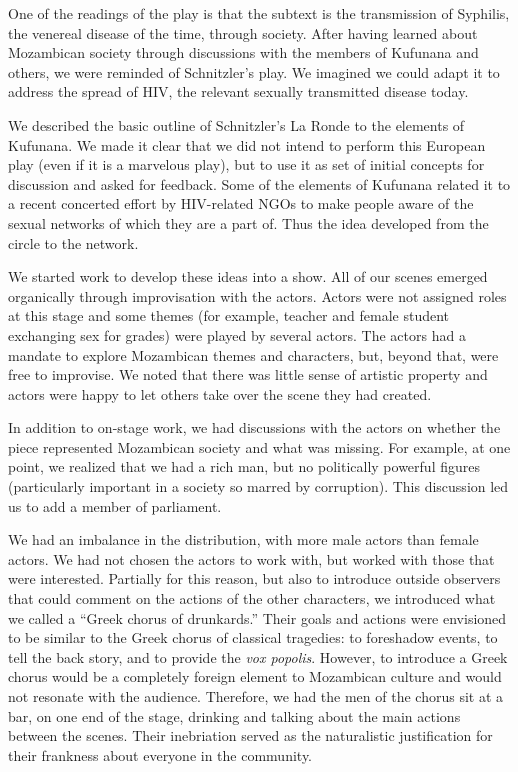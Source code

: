 \documentclass[article,twocolumn]{memoir}
\begin{document}
One of the readings of the play is that the subtext is the transmission of
Syphilis, the venereal disease of the time, through society. After having
learned about Mozambican society through discussions with the members of
Kufunana and others, we were reminded of Schnitzler's play. We imagined we
could adapt it to address the spread of HIV, the relevant sexually transmitted
disease today.

We described the basic outline of Schnitzler's La Ronde to the elements of
Kufunana. We made it clear that we did not intend to perform this European play
(even if it is a marvelous play), but to use it as set of initial concepts for
discussion and asked for feedback. Some of the elements of Kufunana related it
to a recent concerted effort by HIV-related NGOs to make people aware of the
sexual networks of which they are a part of. Thus the idea developed from the
circle to the network.

We started work to develop these ideas into a show. All of our scenes emerged
organically through improvisation with the actors. Actors were not assigned
roles at this stage and some themes (for example, teacher and female student
exchanging sex for grades) were played by several actors. The actors had a
mandate to explore Mozambican themes and characters, but, beyond that, were
free to improvise. We noted that there was little sense of artistic property
and actors were happy to let others take over the scene they had created.

In addition to on-stage work, we had discussions with the actors on whether the
piece represented Mozambican society and what was missing. For example, at one
point, we realized that we had a rich man, but no politically powerful figures
(particularly important in a society so marred by corruption). This discussion
led us to add a member of parliament.

We had an imbalance in the distribution, with more male actors than female
actors. We had not chosen the actors to work with, but worked with those that
were interested. Partially for this reason, but also to introduce outside
observers that could comment on the actions of the other characters, we
introduced what we called a ``Greek chorus of drunkards.'' Their goals and
actions were envisioned to be similar to the Greek chorus of classical
tragedies: to foreshadow events, to tell the back story, and to provide the
\textit{vox popolis}. However, to introduce a Greek chorus would be a
completely foreign element to Mozambican culture and would not resonate with
the audience. Therefore, we had the men of the chorus sit at a bar, on one end
of the stage, drinking and talking about the main actions between the scenes.
Their inebriation served as the naturalistic justification for their frankness
about everyone in the community.
\end{document}
